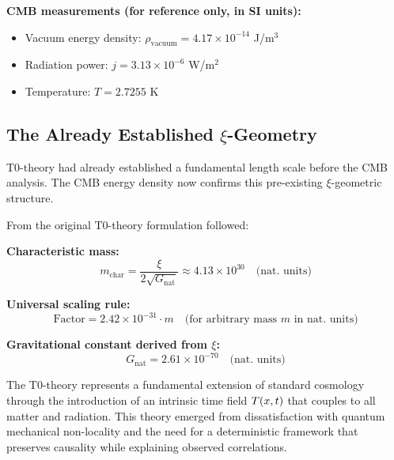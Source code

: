 \documentclass[12pt,a4paper]{report}
\begin{document}
	\begin{sibox}
		\textbf{CMB measurements (for reference only, in SI units):}
		\begin{itemize}
			\item Vacuum energy density: $\rho_{\text{vacuum}} = 4.17 \times 10^{-14}$ J/m$^3$
			\item Radiation power: $j = 3.13 \times 10^{-6}$ W/m$^2$
			\item Temperature: $T = 2.7255$ K
		\end{itemize}
	\end{sibox}
	
	\subsection{The Already Established $\xi$-Geometry}
	
	\begin{important}
		T0-theory had already established a fundamental length scale before the CMB analysis. The CMB energy density now confirms this pre-existing $\xi$-geometric structure.
	\end{important}
	
	From the original T0-theory formulation followed:
	
	\textbf{Characteristic mass:}
	\begin{equation}
		m_{\text{char}} = \frac{\xi}{2\sqrt{G_{\text{nat}}}} \approx 4.13 \times 10^{30} \quad \text{(nat. units)}
	\end{equation}
	
	\textbf{Universal scaling rule:}
	\begin{equation}
		\text{Factor} = 2.42 \times 10^{-31} \cdot m \quad \text{(for arbitrary mass } m \text{ in nat. units)}
	\end{equation}
	
	\textbf{Gravitational constant derived from $\xi$:}
	\begin{equation}
		G_{\text{nat}} = 2.61 \times 10^{-70} \quad \text{(nat. units)}
	\end{equation}
	\label{sec:t0_framework}
	
	The T0-theory represents a fundamental extension of standard cosmology through the introduction of an intrinsic time field $T(x,t)$ that couples to all matter and radiation. This theory emerged from dissatisfaction with quantum mechanical non-locality and the need for a deterministic framework that preserves causality while explaining observed correlations.
	
\end{document}
